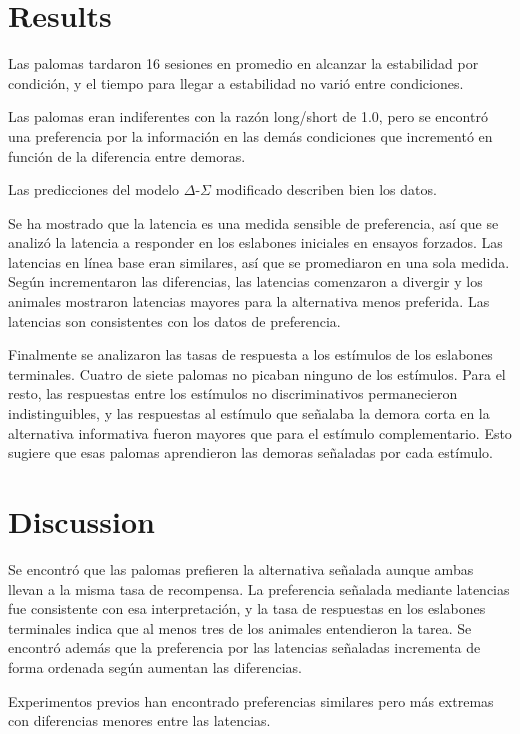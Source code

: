 \documentclass[a4paper,12pt]{article}
\begin{document}
\section{Results}

Las palomas tardaron 16 sesiones en promedio en alcanzar la estabilidad por condición, y el tiempo para llegar a estabilidad no varió entre condiciones.

Las palomas eran indiferentes con la razón long/short de 1.0, pero se encontró una preferencia por la información en las demás condiciones que incrementó en función de la diferencia entre demoras.

Las predicciones del modelo $\Delta$-$\Sigma$ modificado describen bien los datos.

Se ha mostrado que la latencia es una medida sensible de preferencia, así que se analizó la latencia a responder en los eslabones iniciales en ensayos forzados.
Las latencias en línea base eran similares, así que se promediaron en una sola medida.
Según incrementaron las diferencias, las latencias comenzaron a divergir y los animales mostraron latencias mayores para la alternativa menos preferida.
Las latencias son consistentes con los datos de preferencia.

Finalmente se analizaron las tasas de respuesta a los estímulos de los eslabones terminales.
Cuatro de siete palomas no picaban ninguno de los estímulos.
Para el resto, las respuestas entre los estímulos no discriminativos permanecieron indistinguibles, y las respuestas al estímulo que señalaba la demora corta en la alternativa informativa fueron mayores que para el estímulo complementario.
Esto sugiere que esas palomas aprendieron las demoras señaladas por cada estímulo.

\section{Discussion}

Se encontró que las palomas prefieren la alternativa señalada aunque ambas llevan a la misma tasa de recompensa.
La preferencia señalada mediante latencias fue consistente con esa interpretación, y la tasa de respuestas en los eslabones terminales indica que al menos tres de los animales entendieron la tarea.
Se encontró además que la preferencia por las latencias señaladas incrementa de forma ordenada según aumentan las diferencias.

Experimentos previos han encontrado preferencias similares pero más extremas con diferencias menores entre las latencias.
\end{document}
